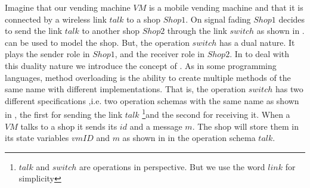 Imagine that our vending machine $VM$ is a mobile vending machine and that it is connected by a wireless link $talk$ to a shop $Shop1$. On signal fading $Shop1$ decides to send the link $talk$ to another shop $Shop2$ through the link $switch$ as shown in . \oz{} can be used to model the shop. But, the operation $switch$ has a dual nature. It plays the sender role in $Shop1$, and the receiver role in $Shop2$.
 In \oz{} to deal with this duality nature we introduce the concept of . As in some programming languages, method overloading is the ability to create multiple methods of the same name with different implementations. That is, the operation $switch$ has two different specifications ,i.e. two operation schemas with the same name as shown in , the first for sending the link $talk$ \footnote{$talk$ and $switch$ are operations in \oz{} perspective. But we use the word $link$ for simplicity}and the second for receiving it.
When a $VM$ talks to a shop it sends its $id$ and a message $m$. The shop will store them in its state variables $vmID$ and $m$ as shown in  in the operation schema $talk$.




